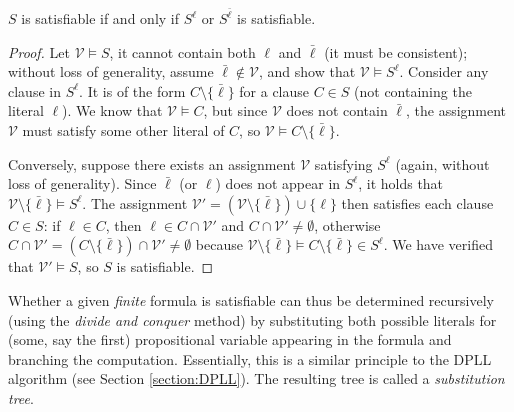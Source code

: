 \begin{lemma}\label{lemma:tree-of-reductions}
$S$ is satisfiable if and only if $S^\ell$ or $S^{\bar{\ell}}$ is satisfiable.    
\end{lemma}
\begin{proof}
Let $\mathcal{V} \models S$, it cannot contain both $\ell$ and $\bar{\ell}$ (it must be consistent); without loss of generality, assume $\bar{\ell} \notin \mathcal{V}$, and show that $\mathcal{V} \models S^\ell$. Consider any clause in $S^\ell$. It is of the form $C \setminus \{\bar{\ell}\}$ for a clause $C \in S$ (not containing the literal $\ell$). We know that $\mathcal{V} \models C$, but since $\mathcal{V}$ does not contain $\bar{\ell}$, the assignment $\mathcal{V}$ must satisfy some other literal of $C$, so $\mathcal{V} \models C \setminus \{\bar{\ell}\}$.

Conversely, suppose there exists an assignment $\mathcal{V}$ satisfying $S^\ell$ (again, without loss of generality). Since $\bar{\ell}$ (or $\ell$) does not appear in $S^\ell$, it holds that $\mathcal{V} \setminus \{\bar{\ell}\} \models S^\ell$. The assignment $\mathcal{V}' = (\mathcal{V} \setminus \{\bar{\ell}\}) \cup \{\ell\}$ then satisfies each clause $C \in S$: if $\ell \in C$, then $\ell \in C \cap \mathcal{V}'$ and $C \cap \mathcal{V}' \neq \emptyset$, otherwise $C \cap \mathcal{V}' = (C \setminus \{\bar{\ell}\}) \cap \mathcal{V}' \neq \emptyset$ because $\mathcal{V} \setminus \{\bar{\ell}\} \models C \setminus \{\bar{\ell}\} \in S^\ell$. We have verified that $\mathcal{V}' \models S$, so $S$ is satisfiable.
\end{proof}

Whether a given \emph{finite} formula is satisfiable can thus be determined recursively (using the \emph{divide and conquer} method) by substituting both possible literals for (some, say the first) propositional variable appearing in the formula and branching the computation. Essentially, this is a similar principle to the DPLL algorithm (see Section \ref{section:DPLL}). The resulting tree is called a \emph{substitution tree}. 

